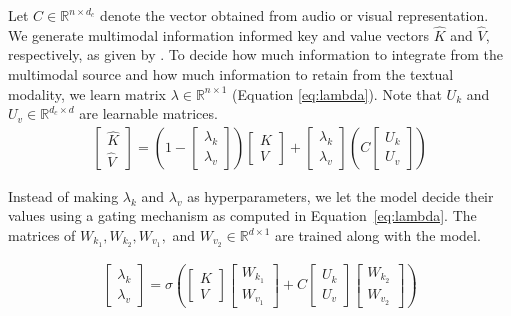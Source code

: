 \documentclass[11pt]{article}
\begin{document}
Let $C\in \mathbb{R}^{n \times d_c}$ denote the vector obtained from audio or visual representation. We generate multimodal information informed key and value vectors $\hat K$ and $\hat V$, respectively, as given by \citet{Yang_Li_Wong_Chao_Wang_Tu_2019}. To decide how much information to integrate from the multimodal source and how much information to retain from the textual modality, we learn matrix $\lambda \in \mathbb{R}^{n \times 1}$ (Equation \ref{eq:lambda}). Note that $U_k$ and $U_v \in \mathbb{R}^{d_c \times d}$ are learnable matrices.
\begin{eqnarray}
    \begin{bmatrix}
    \hat K \\ \hat V
    \end{bmatrix} = (1 - \begin{bmatrix}
    \lambda_k \\ \lambda_v
    \end{bmatrix})\begin{bmatrix}
    K \\ V
    \end{bmatrix} + \begin{bmatrix}
    \lambda_k \\ \lambda_v
    \end{bmatrix}(C\begin{bmatrix}
    U_k \\ U_v
    \end{bmatrix})
\end{eqnarray}

Instead of making $\lambda_k$ and $\lambda_v$ as hyperparameters, we let the model decide their values using a gating mechanism as computed in Equation~\ref{eq:lambda}. The matrices of $W_{k_1}, W_{k_2}, W_{v_1},$ and $W_{v_2} \in \mathbb{R}^{d \times 1}$ are trained along with the model.

\vspace{-1em}
\begin{eqnarray}
    \begin{bmatrix}
    \lambda_k \\ \lambda_v
    \end{bmatrix} = \sigma(\begin{bmatrix}
    K \\ V
    \end{bmatrix} \begin{bmatrix}
    W_{k_1} \\ W_{v_1}
    \end{bmatrix} + C\begin{bmatrix}
    U_k \\ U_v
    \end{bmatrix} \begin{bmatrix}
    W_{k_2} \\ W_{v_2}
    \end{bmatrix})
    \label{eq:lambda}
\end{eqnarray}
\end{document}
